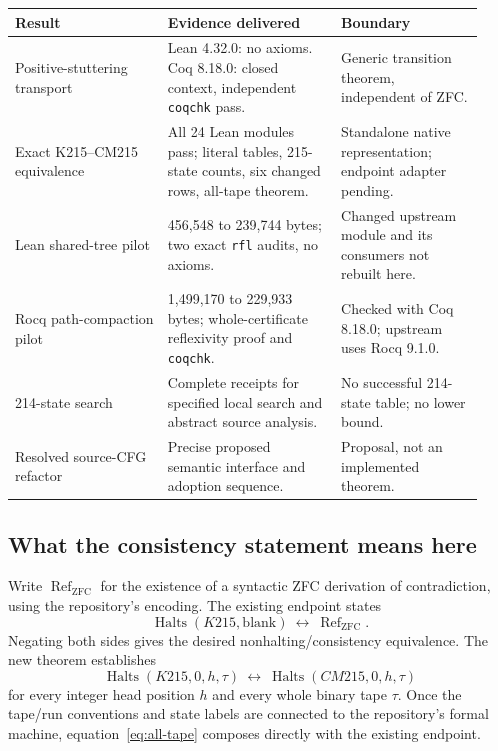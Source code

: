 \documentclass[11pt]{article}
\newcommand{\Halts}{\operatorname{Halts}}
\begin{document}
\begin{center}
\small
\begin{tabular}{@{}p{0.30\linewidth}p{0.34\linewidth}p{0.29\linewidth}@{}}
\toprule
Result & Evidence delivered & Boundary \\
\midrule
Positive-stuttering transport & Lean 4.32.0: no axioms. Coq 8.18.0: closed context, independent \texttt{coqchk} pass. & Generic transition theorem, independent of ZFC. \\
Exact K215--CM215 equivalence & All 24 Lean modules pass; literal tables, 215-state counts, six changed rows, all-tape theorem. & Standalone native representation; endpoint adapter pending. \\
Lean shared-tree pilot & 456,548 to 239,744 bytes; two exact \texttt{rfl} audits, no axioms. & Changed upstream module and its consumers not rebuilt here. \\
Rocq path-compaction pilot & 1,499,170 to 229,933 bytes; whole-certificate reflexivity proof and \texttt{coqchk}. & Checked with Coq 8.18.0; upstream uses Rocq 9.1.0. \\
214-state search & Complete receipts for specified local search and abstract source analysis. & No successful 214-state table; no lower bound. \\
Resolved source-CFG refactor & Precise proposed semantic interface and adoption sequence. & Proposal, not an implemented theorem. \\
\bottomrule
\end{tabular}
\end{center}

\subsection{What the consistency statement means here}

Write $\operatorname{Ref}_{\mathrm{ZFC}}$ for the existence of a syntactic ZFC derivation of contradiction, using the repository's encoding. The existing endpoint states
\[
\Halts(K215,\mathrm{blank})\ \longleftrightarrow\ \operatorname{Ref}_{\mathrm{ZFC}}.
\]
Negating both sides gives the desired nonhalting/consistency equivalence. The new theorem establishes
\[
\Halts(K215,0,h,\tau)\ \longleftrightarrow\ \Halts(CM215,0,h,\tau)
\tag{1}\label{eq:all-tape}
\]
for every integer head position $h$ and every whole binary tape $\tau$. Once the tape/run conventions and state labels are connected to the repository's formal machine, equation~\eqref{eq:all-tape} composes directly with the existing endpoint.
\end{document}
